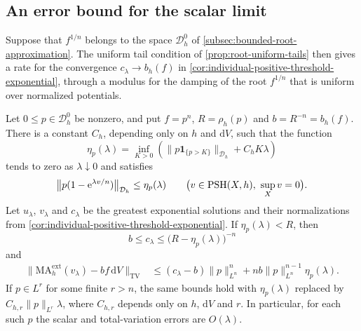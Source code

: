 \subsection{An error bound for the scalar limit}

Suppose that $f^{1/n}$ belongs to the space $\mathcal D_h^0$ of \cref{subsec:bounded-root-approximation}. The uniform tail condition of \cref{prop:root-uniform-tails} then gives a rate for the convergence $c_\lambda\to b_h(f)$ in \cref{cor:individual-positive-threshold-exponential}, through a modulus for the damping of the root $f^{1/n}$ that is uniform over normalized potentials.

\begin{proposition}\label{prop:exponential-root-tail-modulus}
Let $0\leq p\in\mathcal D_h^0$ be nonzero, and put $f=p^n$, $R=\rho_h(p)$ and $b=R^{-n}=b_h(f)$. There is a constant $C_h$, depending only on $h$ and $\mathrm{d}V$, such that the function
\[
 \eta_p(\lambda)=\inf_{K>0}
 \left(\|p\mathbf1_{\{p>K\}}\|_{\mathcal D_h}+C_hK\lambda\right)
\]
tends to zero as $\lambda\downarrow0$ and satisfies
\begin{equation}\label{eq:uniform-root-damping}
 \big\|p(1-\mathrm{e}^{\lambda v/n})\big\|_{\mathcal D_h}
 \leq\eta_p(\lambda)
 \qquad\bigl(v\in\mathrm{PSH}(X,h),\ \sup_Xv=0\bigr).
\end{equation}
Let $u_\lambda$, $v_\lambda$ and $c_\lambda$ be the greatest exponential solutions and their normalizations from \cref{cor:individual-positive-threshold-exponential}. If $\eta_p(\lambda)<R$, then
\[
 b\leq c_\lambda\leq\bigl(R-\eta_p(\lambda)\bigr)^{-n}
\]
and
\begin{align*}
 \big\|\mathrm{MA}^{\mathrm{ext}}_h(v_\lambda)
              -bf\,\mathrm{d}V\big\|_{\mathrm{TV}}
 &\leq(c_\lambda-b)\|p\|_{L^n}^{n}
       +nb\|p\|_{L^n}^{n-1}\eta_p(\lambda).
\end{align*}
If $p\in L^r$ for some finite $r>n$, the same bounds hold with $\eta_p(\lambda)$ replaced by $C_{h,r}\|p\|_{L^r}\lambda$, where $C_{h,r}$ depends only on $h$, $\mathrm{d}V$ and $r$. In particular, for each such $p$ the scalar and total-variation errors are $O(\lambda)$.
\end{proposition}
